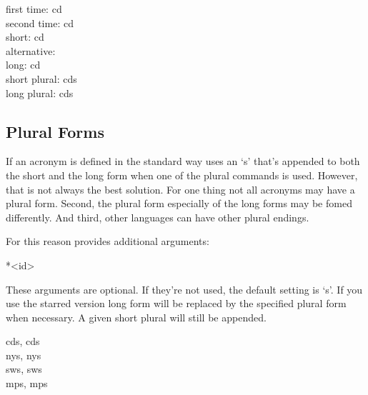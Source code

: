 \documentclass[DIV10,toc=index,toc=bib]{cnpkgdoc}
\begin{document}
\begin{beispiel}
 first time: \ac{cd} \\
 second time: \ac{cd} \\
 short: \acs{cd} \\
 alternative:  \\
 long: \acl{cd} \\
 short plural: \acsp{cd} \\
 long plural: \aclp{cd}
\end{beispiel}

\subsection{Plural Forms}
If an acronym is defined in the standard way \acro uses an `s' that's appended to
both the short and the long form when one of the plural commands is used. However,
that is not always the best solution. For one thing not all acronyms may have a
plural form. Second, the plural form especially of the long forms may be fomed
differently. And third, other languages can have other plural endings.

For this reason  provides additional arguments:
\begin{beschreibung}
 *{<id>}
\end{beschreibung}
These arguments are optional. If they're not used, the default setting is `s'.
If you use the starred version long form will be replaced by the specified plural
form when necessary. A given short plural will still be appended.

\begin{beispiel}
 \acsp{cd}, \aclp{cd} \\
 \acsp{ny}, \aclp{ny} \\
 \acsp{sw}, \aclp{sw} \\
 \acsp{mp}, \aclp{mp}
\end{beispiel}
\end{document}
